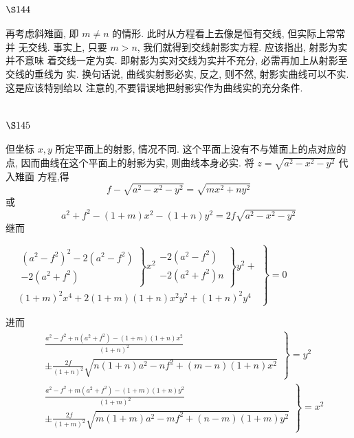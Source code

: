 \section{$\S 144$}

再考虑斜雉面, 即 $m \neq n$ 的情形. 此时从方程看上去像是恒有交线, 但实际上常常并 无交线. 事实上, 只要 $m>n$, 我们就得到交线射影实方程. 应该指出, 射影为实并不意味 着交线一定为实. 即射影为实对交线为实并不充分, 必需再加上从射影至交线的垂线为 实. 换句话说, 曲线实射影必实, 反之, 则不然, 射影实曲线可以不实. 这是应该特别给以 注意的,不要错误地把射影实作为曲线实的充分条件.

\section{$\S 145$}

但坐标 $x, y$ 所定平面上的射影, 情况不同. 这个平面上没有不与雉面上的点对应的 点, 因而曲线在这个平面上的射影为实, 则曲线本身必实. 将 $z=\sqrt{a^{2}-x^{2}-y^{2}}$ 代入雉面 方程,得
\[
f-\sqrt{a^{2}-x^{2}-y^{2}}=\sqrt{m x^{2}+n y^{2}}
\]
或
\[
a^{2}+f^{2}-(1+m) x^{2}-(1+n) y^{2}=2 f \sqrt{a^{2}-x^{2}-y^{2}}
\]
继而

$\left.\begin{array}{l}
	& \left.\left.
	\begin{array}{l}\left(a^2-f^2\right)^2-2\left(a^2-f^2\right) \\ 
		-2\left(a^2+f^2\right)\end{array}\right\} x^2 
	\begin{array}{l}-2\left(a^2-f^2\right) \\ 
		-2\left(a^2+f^2\right) n\end{array}\right\} y^2+ \\ 
	& (1+m)^2 x^4+2(1+m)(1+n) x^2 y^2+(1+n)^2 y^4 
\end{array}
\right\}=0$

进而
\[
\begin{aligned}
& \left.\begin{array}{l}\frac{a^{2}-f^{2}+n\left(a^{2}+f^{2}\right)-(1+m)(1+n) x^{2}}{(1+n)^{2}} \\\pm \frac{2 f}{(1+n)^{2}} \sqrt{n(1+n) a^{2}-n f^{2}+(m-n)(1+n) x^{2}}\end{array}\right\}=y^{2} \\
& \left.\begin{array}{l}\frac{a^{2}-f^{2}+m\left(a^{2}+f^{2}\right)-(1+m)(1+n) y^{2}}{(1+m)^{2}} \\\pm \frac{2 f}{(1+m)^{2}} \sqrt{m(1+m) a^{2}-m f^{2}+(n-m)(1+m) y^{2}}\end{array}\right\}=x^{2}
\end{aligned}
\]
